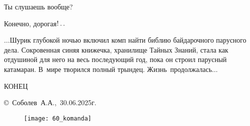{\diagdash Ты слушаешь вообще?

\diagdash Конечно, дорогая$\exldots$%

\vspace*{1em}

$\ldots$Шурик глубокой ночью включил комп найти библию байдарочного парусного дела\cite{Перегудов}. Сокровенная синяя книжечка, хранилище Тайных Знаний, стала как отдушиной для него на весь последующий год, пока он строил парусный катамаран. В~мире творился полный трындец. Жизнь~продолжалась$\ldots$


%


\begin{center}
\end{center}

\begin{center}
	\Large {КОНЕЦ}
\end{center}
}

\vspace*{\fill}
\begin{flushright}
	\copyright~Соболев~А.А.,~30.06.2025г.\\
\end{flushright}







\fancyhead[LE]{\fancyplain{}{}}
\fancyhead[RO]{\fancyplain{}{}}

\vspace*{4.0em}

\begin{figure}[!h]
	\centering
	\texttt{[image: 60\_komanda]}
\end{figure}



